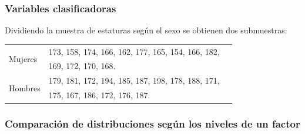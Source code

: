 \begin{frame}
\frametitle{Variables clasificadoras}
Dividiendo la muestra de estaturas según el sexo se obtienen dos submuestras:

\begin{center}
\begin{tabular}{lll}
\hline
\multirow{2}{*}{Mujeres} &
173, 158, 174, 166, 162, 177, 165, 154, 166, 182, \\
& 169, 172, 170, 168. \\
\hline
\multirow{2}{*}{Hombres} &
179, 181, 172, 194, 185, 187, 198, 178, 188, 171,\\
& 175, 167, 186, 172, 176, 187. \\
\hline
\end{tabular}
\end{center}

\end{frame}


\begin{frame}
\frametitle{Comparación de distribuciones según los niveles de un factor}

\begin{center} 
\scalebox{0.45}{}
\scalebox{0.45}{}
\end{center}
\end{frame}
